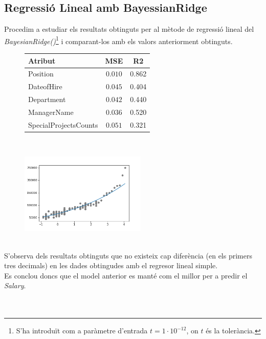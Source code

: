 \documentclass[a4paper, 11pt]{article}
\begin{document}
\subsection{Regressió Lineal amb BayessianRidge}
Procedim a estudiar els resultats obtinguts per al mètode de regressió lineal del \\ \textit{BayesianRidge()}\footnote{S'ha introduït com a paràmetre d'entrada $t = 1\cdot 10^{-12}$, on $t$ és la tolerància.} i comparant-los amb els valors anteriorment obtinguts.
\begin{figure}[h] %
\begin{minipage}{8cm} %
\begin{center}
    \begin{tabular}{l||c|c}
        \textbf{Atribut} & MSE & R2 \\ \hline \hline
        Position & $0.010$ & 0.862 \\\hline
        DateofHire & $0.045$ & 0.404 \\\hline
        Department & $0.042$ & 0.440 \\\hline
        ManagerName & $0.036$ & 0.520 \\\hline
        SpecialProjectsCounts & $0.051$ & 0.321 \\
    \end{tabular}\\
    \label{tab:afins}
\end{center}
\end{minipage} %
\hspace{2em}
\begin{minipage}{6.3cm} %
\begin{center}
   \begin{center}
    \includegraphics[width=6cm]{bayes/bayes_lineal_position.png}
    \label{regresor_lineal_simple}
    \end{center}
\end{center}
\end{minipage} %
\end{figure} %
\\
S'observa dels resultats obtinguts que no existeix cap diferència (en els primers tres decimals) en les dades obtingudes  amb el regresor lineal simple. \\
Es conclou doncs que el model anterior es manté com el millor per a predir el \textit{Salary}.
\\\\\\
\end{document}
